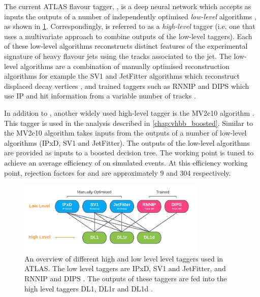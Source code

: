 The current ATLAS flavour tagger, \DLr \cite{ATL-PHYS-PUB-2017-013}, is a deep neural network which accepts as inputs the outputs of a number of independently optimised \textit{low-level} algorithms \cite{FTAG-2018-01}, as shown in \cref{fig:high_low_taggers}.
Correspondingly, \DLr is referred to as a \textit{high-level} tagger (i.e. one that uses a multivariate approach to combine outputs of the low-level taggers).
Each of these low-level algorithms reconstructs distinct features of the experimental signature of heavy flavour jets using the tracks associated to the jet.
The low-level algorithms are a combination of manually optimised reconstruction algorithms for example the SV1 and JetFitter algorithms which reconstruct displaced decay vertices \cite{FTAG-2018-01,ATL-PHYS-PUB-2017-011}, and trained taggers such as RNNIP and DIPS which use IP and hit information from a variable number of tracks \cite{ATL-PHYS-PUB-2017-003,ATL-PHYS-PUB-2020-014}.

In addition to \DLr, another widely used high-level tagger is the MV2c10 algorithm \cite{ATL-PHYS-PUB-2015-022,FTAG-2018-01,ATL-PHYS-PUB-2017-013}.
This tagger is used in the analysis described in \cref{chap:vhbb_boosted}.
Similar to \DLr the MV2c10 algorithm takes inputs from the outputs of a number of low-level algorithms (IPxD, SV1 and JetFitter).
The outputs of the low-level algorithms are provided as inputs to a boosted decision tree.
The working point is tuned to achieve an average \bjet efficiency of  on simulated \ttbar events.
At this efficiency working point, rejection factors for \cjets and \ljets are approximately 9 and 304 respectively.


\begin{figure}[!htbp]
  \centering
  \includegraphics[width=0.8\textwidth]{chapters/3.tracking/figs/high_low_taggers.pdf}
  \caption{
    An overview of different high and low level level taggers used in ATLAS.
    The low level taggers are IPxD, SV1 and JetFitter, and RNNIP and DIPS \cite{FTAG-2018-01,ATL-PHYS-PUB-2017-011,ATL-PHYS-PUB-2017-003,ATL-PHYS-PUB-2020-014}.
    The outputs of these taggers are fed into the high level taggers DL1, DL1r and DL1d \cite{ATL-PHYS-PUB-2017-013,ATLAS:2022qxm}.
  }
  \label{fig:high_low_taggers}
\end{figure}


